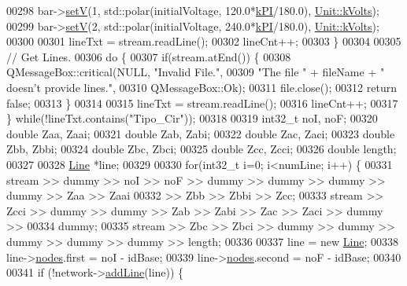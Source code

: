 \begin{DoxyCode}
00298     bar->\hyperlink{group___models_ga8d1e70b2d11ed4245e81b8b20858079d}{setV}(1, std::polar(initialVoltage, 120.0*\hyperlink{math__constants_8h_a368d99984512d9a6c6f18b37b4446431}{kPI}/180.0), 
      \hyperlink{class_unit_a55b07dfa9457e1eca2c7194fe0cfc3c1aa54b2473993a702a3923525765bd6e4c}{Unit::kVolts});
00299     bar->\hyperlink{group___models_ga8d1e70b2d11ed4245e81b8b20858079d}{setV}(2, std::polar(initialVoltage, 240.0*\hyperlink{math__constants_8h_a368d99984512d9a6c6f18b37b4446431}{kPI}/180.0), 
      \hyperlink{class_unit_a55b07dfa9457e1eca2c7194fe0cfc3c1aa54b2473993a702a3923525765bd6e4c}{Unit::kVolts});
00300 
00301     lineTxt = stream.readLine();
00302     lineCnt++;
00303   \}
00304 
00305 \textcolor{comment}{// Get Lines.}
00306   \textcolor{keywordflow}{do} \{
00307     \textcolor{keywordflow}{if}(stream.atEnd()) \{
00308       QMessageBox::critical(NULL, \textcolor{stringliteral}{"Invalid File."},
00309                             \textcolor{stringliteral}{"The file "} + fileName + \textcolor{stringliteral}{" doesn't provide lines."},
00310                             QMessageBox::Ok);
00311       file.close();
00312       \textcolor{keywordflow}{return} \textcolor{keyword}{false};
00313     \}
00314 
00315     lineTxt = stream.readLine();
00316     lineCnt++;
00317   \} \textcolor{keywordflow}{while}(!lineTxt.contains(\textcolor{stringliteral}{"Tipo\_Cir"}));
00318 
00319   int32\_t noI, noF;
00320   \textcolor{keywordtype}{double} Zaa, Zaai;
00321   \textcolor{keywordtype}{double} Zab, Zabi;
00322   \textcolor{keywordtype}{double} Zac, Zaci;
00323   \textcolor{keywordtype}{double} Zbb, Zbbi;
00324   \textcolor{keywordtype}{double} Zbc, Zbci;
00325   \textcolor{keywordtype}{double} Zcc, Zcci;
00326   \textcolor{keywordtype}{double} length;
00327 
00328   \hyperlink{class_line}{Line} *line;
00329 
00330   \textcolor{keywordflow}{for}(int32\_t i=0; i<numLine; i++) \{
00331     stream >> dummy >> noI >> noF >> dummy >> dummy >> dummy >> dummy >> Zaa >> Zaai
00332            >> Zbb >> Zbbi >> Zcc;
00333     stream >> Zcci >> dummy >> dummy >> Zab >> Zabi >> Zac >> Zaci >> dummy >>
00334            dummy;
00335     stream >> Zbc >> Zbci >> dummy >> dummy >> dummy >> dummy >> dummy >>   length;
00336 
00337     line = \textcolor{keyword}{new} \hyperlink{class_line}{Line};
00338     line->\hyperlink{class_line_afd17c40d656e6a8d677cb22df5f0c70b}{nodes}.first = noI - idBase;
00339     line->\hyperlink{class_line_afd17c40d656e6a8d677cb22df5f0c70b}{nodes}.second = noF - idBase;
00340 
00341     \textcolor{keywordflow}{if} (!network->\hyperlink{group___models_gae02945131494987b3ff9b59b627719b4}{addLine}(line)) \{

\end{DoxyCode}
